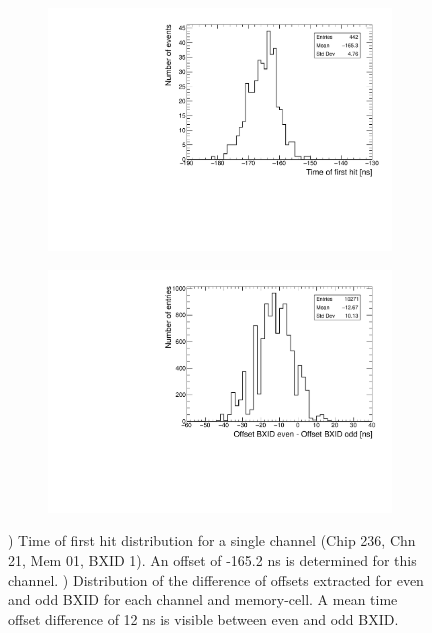\begin{figure}[htbp!]
	\begin{subfigure}[t]{0.49\textwidth}
		\centering
		\includegraphics[width=1\textwidth]{../Thesis_Plots/Timing/Muons/Plots/Timing_Chip236_Chn21_Mem01_BXID1_withOffset.pdf}
		\caption{}\label{fig:TimeChnwithOffset}
	\end{subfigure}
	\hfill
	\begin{subfigure}[t]{0.49\textwidth}
		\centering
		\includegraphics[width=1\textwidth]{../Thesis_Plots/Timing/Muons/Plots/BXIDDifferenceOffsets.pdf}
		\caption{}\label{fig:BXID_offset}
	\end{subfigure}
	\caption{) Time of first hit distribution for a single channel (Chip 236, Chn 21, Mem 01, BXID 1). An offset of -165.2 ns is determined for this channel. ) Distribution of the difference of offsets extracted for even and odd BXID for each channel and memory-cell. A mean time offset difference of 12 ns is visible between even and odd BXID.}
\end{figure}


